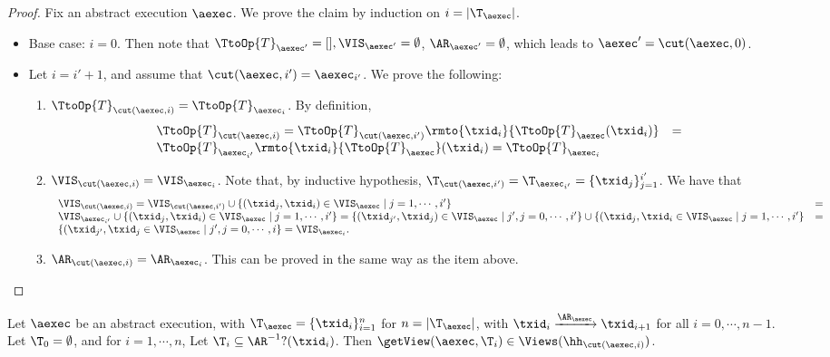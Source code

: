 \begin{proof}
Fix an abstract execution $\aexec$. We prove the claim by induction on $i = \lvert \T_{\aexec} \rvert$.
\begin{itemize}
\item Base case: $i = 0$. Then note that $\TtoOp{T}_{\aexec'} = [], \VIS_{\aexec'} = \emptyset$, 
$\AR_{\aexec'} = \emptyset$, which leads to $\aexec' = \cut(\aexec, 0)$. 
\item Let $i = i' + 1$, and assume that $\cut(\aexec, i') = \aexec_{i'}$. 
We prove the following: 
\begin{enumerate}
\item $\TtoOp{T}_{\cut(\aexec, i)} = \TtoOp{T}_{\aexec_i}$. 
By definition, 
\[
\begin{array}{lr}
\TtoOp{T}_{\cut(\aexec,i)} = \TtoOp{T}_{\cut(\aexec, i')}\rmto{\txid_{i}}{\TtoOp{T}_{\aexec}(\txid_{i})} &= \\
\TtoOp{T}_{\aexec_{i'}}\rmto{\txid_{i}}{\TtoOp{T}_{\aexec}}(\txid_{i}) = \TtoOp{T}_{\aexec_{i}}
\end{array}
\]
\item $\VIS_{\cut(\aexec, i)} = \VIS_{\aexec_{i}}$. 
Note that, by inductive hypothesis, $\T_{\cut(\aexec, i')} = \T_{\aexec_{i'}} = \{\txid_{j}\}_{j=1}^{i'}$. 
We have that  
\[
\begin{array}{lr}
\VIS_{\cut(\aexec, i)} = \VIS_{\cut(\aexec, i')} \cup \{(\txid_j, \txid_{i}) \in \VIS_{\aexec} \mid j = 1,\cdots, i'\} &= \\
\VIS_{\aexec_{i'}} \cup \{(\txid_{j}, \txid_{i}) \in \VIS_{\aexec} \mid j=1,\cdots, i'\} = 
\{(\txid_{j'}, \txid_{j}) \in \VIS_{\aexec} \mid j', j = 0,\cdots, i'\} \cup \{(\txid_{j}, \txid_{i} \in \VIS_{\aexec} \mid j=1,\cdots, i'\} &=\\
\{(\txid_{j'}, \txid_{j} \in \VIS_{\aexec} \mid j',j = 0,\cdots, i\} = \VIS_{\aexec_{i}}.
\end{array}
\]
\item $\AR_{\cut(\aexec, i)} = \AR_{\aexec_{i}}$. This can be proved in the same way 
as the item above. 
\end{enumerate}
\end{itemize}
\end{proof}

\begin{lemma}
\label{lem:cut.views}
Let $\aexec$ be an abstract execution, with 
$\T_{\aexec} = \{\txid_{i}\}_{i = 1}^{n}$ for 
$n = \lvert \T_{\aexec} \rvert$, with $\txid_{i} \xrightarrow{\AR_{\aexec}} \txid_{i+1}$ 
for all $i=0,\cdots, n-1$.  Let $\T_{0} = \emptyset$, and for $i=1,\cdots, n$, Let $\T_{i} \subseteq \AR^{-1}?(\txid_{i})$. 
Then $\getView(\aexec, \T_{i}) \in \Views(\hh_{\cut(\aexec, i)})$.
\end{lemma}


